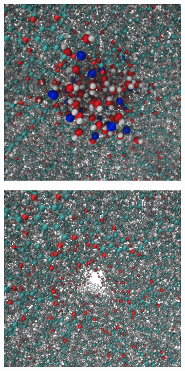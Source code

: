 \documentclass[journal=jpcbfk,manusciprt=article]{achemso}
\begin{document}
  \begin{figure}[!htb]
  \centering
        \begin{subfigure}{0.45\textwidth}
                \includegraphics[width=\textwidth]{water_filled_pore.png}
                \caption{}\label{fig:water_filled_pores}
        \end{subfigure}
        \begin{subfigure}{0.45\textwidth}
                \includegraphics[width=\textwidth]{water_removed.png}

\end{subfigure}
\end{figure}
\end{document}
